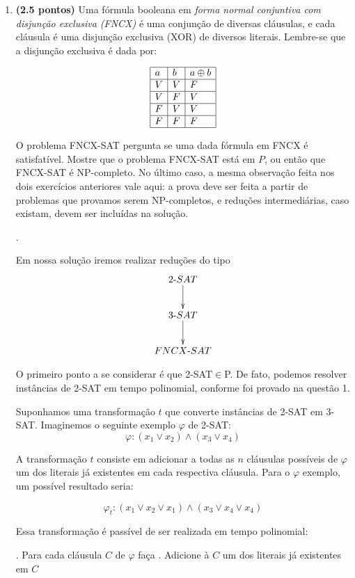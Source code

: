 \documentclass[12pt]{article}
\newcommand{\resposta}[1]{ \noindent {\bf Solução}.{\color{blue} #1}}
\begin{document}
\begin{enumerate}
\item {\bf (2.5 pontos)} Uma fórmula booleana em {\it forma normal conjuntiva com disjunção exclusiva (FNCX)} é uma conjunção de diversas cláusulas, e cada cláusula é uma disjunção exclusiva (XOR) de diversos literais. Lembre-se que a disjunção exclusiva é dada por:

  $$\begin{array}{|l|l|l|}\hline
      a & b & a \oplus b \\ \hline
      V & V & F \\ \hline
      V & F & V \\ \hline
      F & V & V \\ \hline
      F & F & F \\ \hline
  \end{array}$$

  O problema FNCX-SAT pergunta se uma dada fórmula em FNCX é
  satisfatível. Mostre que o problema FNCX-SAT está em $P$, ou então
  que FNCX-SAT é NP-completo. No último caso, a mesma observação feita
  nos dois exercícios anteriores vale aqui: a prova deve ser feita a
  partir de problemas que provamos serem NP-completos, e reduções
  intermediárias, caso existam, devem ser incluídas na solução.

  \resposta{
    Em nossa solução iremos realizar reduções do tipo 
    $$\xymatrix{
    2\mbox{-}SAT \ar[d] \\
    3\mbox{-}SAT \ar[d] \\
    FNCX\mbox{-}SAT 
  }$$
  
  O primeiro ponto a se considerar é que 2-SAT$\in$P. De fato, podemos resolver instâncias de 2-SAT em tempo polinomial, conforme foi provado na questão 1.
  
  Suponhamos uma transformação $t$ que converte instâncias de 2-SAT em 3-SAT. Imaginemos o seguinte exemplo $\varphi$ de 2-SAT: $$\varphi: (x_1 \vee x_2) \wedge (x_3 \vee x_4)$$
  
  A transformação $t$ consiste em adicionar a todas as $n$ cláusulas possíveis de $\varphi$ um dos literais já existentes em cada respectiva cláusula. Para o $\varphi$ exemplo, um possível resultado seria:
  
  $$\varphi_t: (x_1 \vee x_2 \vee x_1) \wedge (x_3 \vee x_4 \vee x_4)$$
  
  Essa transformação é passível de ser realizada em tempo polinomial:
  \newline
  \begin{itemize}
      \itemize 1. Para cada cláusula $C$ de $\varphi$ faça
      \newline
      \itemize 2. \quad Adicione à $C$ um dos literais já existentes em $C$
  \end{itemize}
  
}
\end{enumerate}
\end{document}
